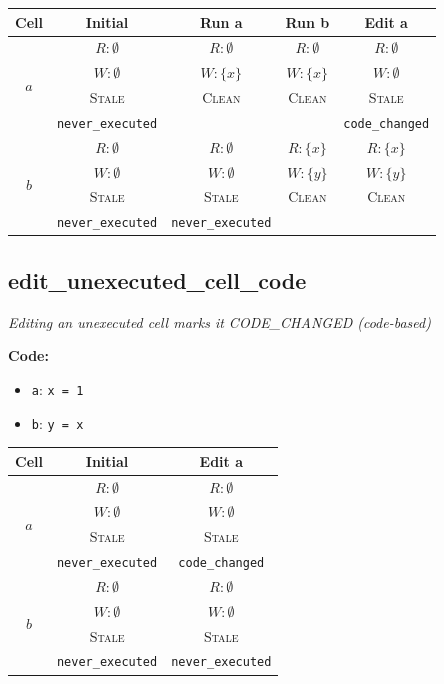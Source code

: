 \documentclass{article}
\begin{document}
\begin{center}
\small
\begin{tabular}{|c|c|c|c|c|}
\hline
\textbf{Cell} & \textbf{Initial} & \textbf{Run a} & \textbf{Run b} & \textbf{Edit a} \\
\hline
\multirow{4}{*}{$a$}
  & $R: \emptyset$ & $R: \emptyset$ & $R: \emptyset$ & $R: \emptyset$ \\
  & $W: \emptyset$ & $W: \{x\}$ & $W: \{x\}$ & $W: \emptyset$ \\
  & \textsc{Stale} & \textsc{Clean} & \textsc{Clean} & \textsc{Stale} \\
  & \footnotesize\texttt{never\_executed} &  &  & \footnotesize\texttt{code\_changed} \\
\hline
\multirow{4}{*}{$b$}
  & $R: \emptyset$ & $R: \emptyset$ & $R: \{x\}$ & $R: \{x\}$ \\
  & $W: \emptyset$ & $W: \emptyset$ & $W: \{y\}$ & $W: \{y\}$ \\
  & \textsc{Stale} & \textsc{Stale} & \textsc{Clean} & \textsc{Clean} \\
  & \footnotesize\texttt{never\_executed} & \footnotesize\texttt{never\_executed} &  &  \\
\hline
\end{tabular}
\end{center}


\subsection{edit\_unexecuted\_cell\_code}
\textit{Editing an unexecuted cell marks it CODE\_CHANGED (code-based)}

\textbf{Code:}
\begin{itemize}
  \item \texttt{a}: \verb|x = 1|
  \item \texttt{b}: \verb|y = x|
\end{itemize}

\begin{center}
\small
\begin{tabular}{|c|c|c|}
\hline
\textbf{Cell} & \textbf{Initial} & \textbf{Edit a} \\
\hline
\multirow{4}{*}{$a$}
  & $R: \emptyset$ & $R: \emptyset$ \\
  & $W: \emptyset$ & $W: \emptyset$ \\
  & \textsc{Stale} & \textsc{Stale} \\
  & \footnotesize\texttt{never\_executed} & \footnotesize\texttt{code\_changed} \\
\hline
\multirow{4}{*}{$b$}
  & $R: \emptyset$ & $R: \emptyset$ \\
  & $W: \emptyset$ & $W: \emptyset$ \\
  & \textsc{Stale} & \textsc{Stale} \\
  & \footnotesize\texttt{never\_executed} & \footnotesize\texttt{never\_executed} \\
\hline
\end{tabular}
\end{center}
\end{document}

